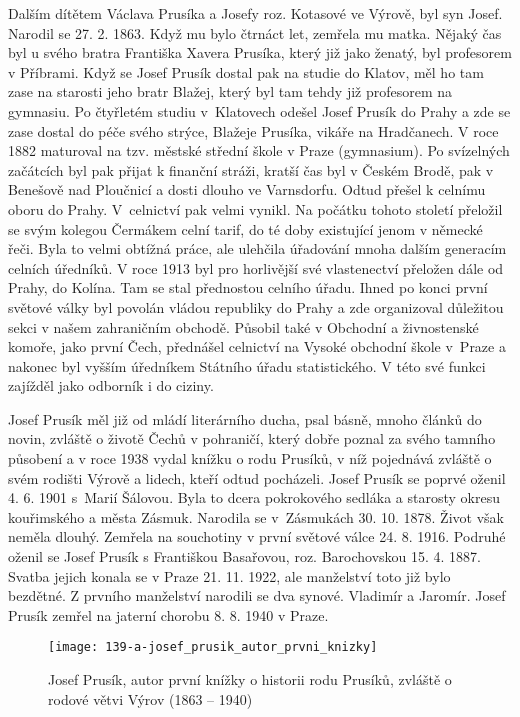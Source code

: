 \documentclass[../dejiny-rodu-prusiku.tex]{subfiles}
\begin{document}
Dalším dítětem Václava Prusíka a Josefy roz. Kotasové ve Výrově, byl syn Josef. Narodil se 27. 2. 1863. Když mu bylo čtrnáct let, zemřela mu matka. Nějaký čas byl u svého bratra Františka Xavera Prusíka, který již jako ženatý, byl profesorem v Příbrami. Když se Josef Prusík dostal pak na studie do Klatov, měl ho tam zase na starosti jeho bratr Blažej, který byl tam tehdy již pro­fesorem na gymnasiu. Po čtyřletém studiu v Klatovech odešel Josef Prusík do Prahy a zde se zase dostal do péče svého strýce, Blažeje Prusíka, vikáře na Hradčanech. V roce 1882 maturoval na tzv. městské střední škole v Praze  (gymnasium). Po svízelných začátcích byl pak při­jat k finanční stráži, kratší čas byl v Českém Brodě, pak v Benešově nad Ploučnicí a dosti dlouho ve Varnsdorfu. Odtud přešel k celnímu oboru do Prahy. V celnictví pak velmi vynikl. Na počátku tohoto století přeložil se svým kolegou Čermákem celní tarif, do té doby existují­cí jenom v německé řeči. Byla to velmi obtížná práce, ale ulehčila úřadování mnoha dalším generacím celních úředníků. V roce 1913 byl pro horlivější své vlastenectví přeložen dále od Prahy, do Kolína. Tam se stal předno­stou celního úřadu. Ihned po konci první světové války byl povolán vládou republiky do Prahy a zde organizoval důležitou sekci v našem zahraničním obchodě. Působil také v Obchodní a živnostenské komoře, jako první Čech, přednášel celnictví na Vysoké obchodní škole v Praze a nakonec byl vyšším úředníkem Státního úřadu statistické­ho. V této své funkci zajížděl jako odborník i do ciziny.

Josef Prusík měl již od mládí literárního ducha, psal básně, mnoho článků do novin, zvláště o životě Čechů v pohraničí, který dobře poznal za svého tamního působení a v roce 1938 vydal knížku o rodu Prusíků, v níž pojedná­vá zvláště o svém rodišti Výrově a lidech, kteří odtud pocházeli. Josef Prusík se poprvé oženil 4. 6. 1901 s Marií Šálovou. Byla to dcera pokrokového sedláka a starosty okresu kouřimského a města Zásmuk. Narodila se v Zásmukách 30. 10. 1878. Život však neměla dlouhý. Zemřela na souchotiny v první světové válce 24. 8. 1916. Podruhé oženil se Josef Prusík s Františkou Basařovou, roz. Barochovskou 15. 4. 1887. Svatba jejich konala se v Praze 21. 11. 1922, ale manželství toto již bylo bezdětné. Z prvního manžel­ství narodili se dva synové. Vladimír a Jaromír. Josef Prusík zemřel na jaterní chorobu 8. 8. 1940 v Praze.

\begin{figure}
\centering
\texttt{[image: 139-a-josef\_prusik\_autor\_prvni\_knizky]}
\caption{Josef Prusík, autor první knížky o historii rodu Prusíků, zvláště o rodové větvi Výrov (1863 – 1940)}
\label{fig:139-a-josef_prusik_autor_prvni_knizky}
\end{figure}
\end{document}

